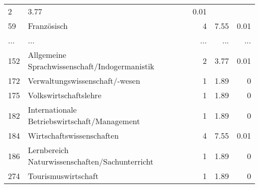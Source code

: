 \begin{longtable}{lXrrr}
          \num{2} &
          \num[round-mode=places,round-precision=2]{3.77} &
          \num[round-mode=places,round-precision=2]{0.01} \\
        59 & \multicolumn{1}{X}{Französisch} & %
          \num{4} &
          \num[round-mode=places,round-precision=2]{7.55} &
          \num[round-mode=places,round-precision=2]{0.01} \\
       ... & ... & ... & ... & ... \\
        152 & \multicolumn{1}{X}{Allgemeine Sprachwissenschaft/Indogermanistik} & %
          \num{2} &
          \num[round-mode=places,round-precision=2]{3.77} &
          \num[round-mode=places,round-precision=2]{0.01} \\

        172 & \multicolumn{1}{X}{Verwaltungswissenschaft/-wesen} & %
          \num{1} &
          \num[round-mode=places,round-precision=2]{1.89} &
          \num[round-mode=places,round-precision=2]{0} \\

        175 & \multicolumn{1}{X}{Volkswirtschaftslehre} & %
          \num{1} &
          \num[round-mode=places,round-precision=2]{1.89} &
          \num[round-mode=places,round-precision=2]{0} \\

        182 & \multicolumn{1}{X}{Internationale Betriebswirtschaft/Management} & %
          \num{1} &
          \num[round-mode=places,round-precision=2]{1.89} &
          \num[round-mode=places,round-precision=2]{0} \\

        184 & \multicolumn{1}{X}{Wirtschaftswissenschaften} & %
          \num{4} &
          \num[round-mode=places,round-precision=2]{7.55} &
          \num[round-mode=places,round-precision=2]{0.01} \\

        186 & \multicolumn{1}{X}{Lernbereich Naturwissenschaften/Sachunterricht} & %
          \num{1} &
          \num[round-mode=places,round-precision=2]{1.89} &
          \num[round-mode=places,round-precision=2]{0} \\

        274 & \multicolumn{1}{X}{Tourismuswirtschaft} & %
          \num{1} &
          \num[round-mode=places,round-precision=2]{1.89} &
          \num[round-mode=places,round-precision=2]{0} \\


\end{longtable}
